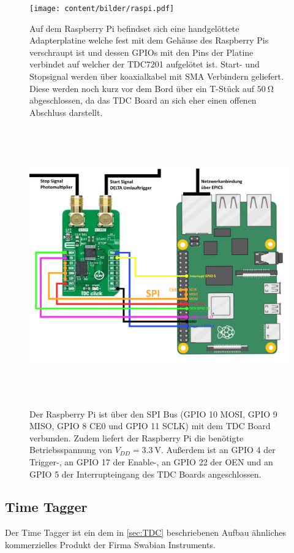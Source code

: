 \begin{figure}
  \centering
  \texttt{[image: content/bilder/raspi.pdf]}
  \caption{Auf dem Raspberry Pi befindset sich eine handgelöttete Adapterplatine welche fest mit dem Gehäuse
    des Raspberry Pis verschraupt ist und dessen GPIOs mit den Pins der Platine verbindet auf welcher der TDC7201
    aufgelötet ist. Start- und Stopsignal werden über koaxialkabel mit SMA Verbindern geliefert. Diese werden noch
    kurz vor dem Bord über ein T-Stück auf $\SI{50}{\ohm}$ abgeschlossen, da das TDC Board an sich eher einen offenen
    Abschluss darstellt.}
  \label{fig:raspi}
\end{figure}

\begin{figure}
  \centering
  \includegraphics[width=16cm, height=12cm]{content/bilder/RaspiTdcSchaltung.pdf}
  \caption{Der Raspberry Pi ist über den SPI Bus (GPIO 10 MOSI, GPIO 9 MISO, GPIO 8 CE0 und GPIO 11 SCLK) mit dem TDC Board verbunden. 
    Zudem liefert der Raspberry Pi die benötigte Betriebsspannung von $V_{DD}=\SI{3,3}{\volt}$. Außerdem ist an GPIO 4 der
    Trigger-, an GPIO 17 der Enable-, an GPIO 22 der OEN und an GPIO 5 der Interrupteingang des TDC Boards angeschlossen. } 
  \label{fig:raspitdcschaltung}
\end{figure}

\subsection{Time Tagger}
\label{sec:TimeTagger}
Der Time Tagger ist ein dem in \autoref{sec:TDC} beschriebenen Aufbau ähnliches kommerzielles Produkt
der Firma Swabian Instruments.